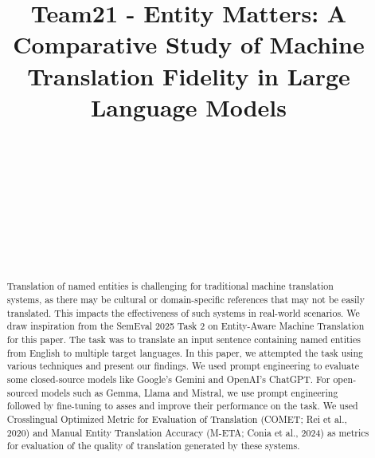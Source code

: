 \documentclass{ecai}
\begin{document}
\begin{frontmatter}

\title{Team21 - Entity Matters: A Comparative Study of Machine Translation Fidelity in Large Language Models}

\author{~}
\author{}
\author{~}
\author{~}
\author{~}
\author{~}


\begin{abstract}
Translation of named entities is challenging for traditional machine translation systems, as there may be cultural 
or domain-specific references that may not be easily translated. 
This impacts the effectiveness of such systems in real-world scenarios. 
We draw inspiration from the SemEval 2025 Task 2 on Entity-Aware Machine Translation for this paper. 
The task was to translate an input sentence containing named entities from English to multiple target languages. 
In this paper, we attempted the task using various techniques and present our findings. 
We used prompt engineering to evaluate some closed-source models like Google's Gemini and OpenAI's ChatGPT. 
For open-sourced models such as Gemma, Llama and Mistral, we use prompt engineering followed by fine-tuning
to asses and improve their performance on the task.
We used Crosslingual Optimized Metric for Evaluation of Translation (COMET; Rei et al., 2020)\cite{conia-etal-2024-m-eta}
and Manual Entity Translation Accuracy (M-ETA; Conia et al., 2024)\cite{rei-etal-2020-comet} 
as metrics for evaluation of the quality of translation generated by these systems.
\end{abstract}
\end{frontmatter}

\end{document}
